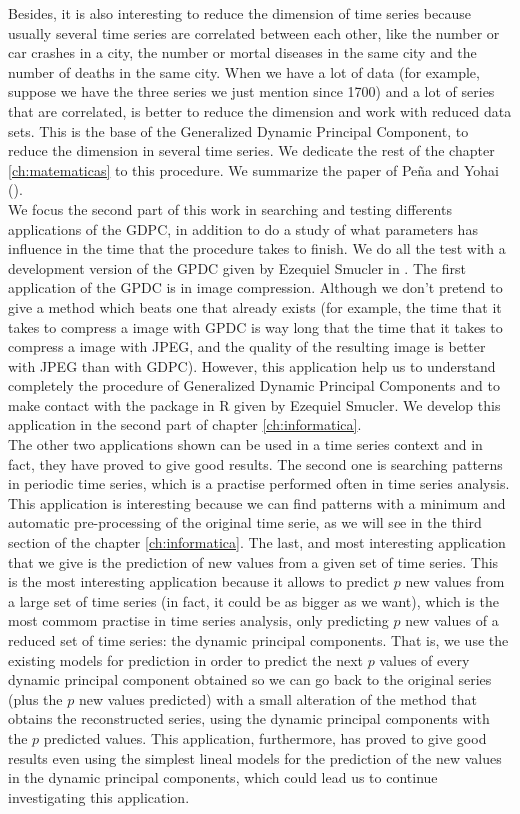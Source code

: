 Besides, it is also interesting to reduce the dimension of time series because usually several time series are correlated between each other, like the number or car crashes in a city, the number or mortal diseases in the same city and the number of deaths in the same city. When we have a lot of data (for example, suppose we have the three series we just mention since 1700) and a lot of series that are correlated, is better to reduce the dimension and work with reduced data sets. This is the base of the Generalized Dynamic Principal Component, to reduce the dimension in several time series. We dedicate the rest of the chapter \ref{ch:matematicas} to this procedure. We summarize the paper of Peña and Yohai (\cite{pena16}).\\

We focus the second part of this work in searching and testing differents applications of the GDPC, in addition to do a study of what parameters has influence in the time that the procedure takes to finish. We do all the test with a development version of the GPDC given by Ezequiel Smucler in \cite{ezeq}. The first application of the GPDC is in image compression. Although we don't pretend to give a method which beats one that already exists (for example, the time that it takes to compress a image with GPDC is way long that the time that it takes to compress a image with JPEG, and the quality of the resulting image is better with JPEG than with GDPC). However, this application help us to understand completely the procedure of Generalized Dynamic Principal Components and to make contact with the package in R given by Ezequiel Smucler. We develop this application in the second part of chapter \ref{ch:informatica}.\\

The other two applications shown can be used in a time series context and in fact, they have proved to give good results. The second one is searching patterns in periodic time series, which is a practise performed often in time series analysis. This application is interesting because we can find patterns with a minimum and automatic pre-processing of the original time serie, as we will see in the third section of the chapter \ref{ch:informatica}. The last, and most interesting application that we give is the prediction of new values from a given set of time series. This is the most interesting application because it allows to predict $p$ new values from a large set of time series (in fact, it could be as bigger as we want), which is the most commom practise in time series analysis, only predicting $p$ new values of a reduced set of time series: the dynamic principal components. That is, we use the existing models for prediction in order to predict the next $p$ values of every dynamic principal component obtained so we can go back to the original series (plus the $p$ new values predicted) with a small alteration of the method that obtains the reconstructed series, using the dynamic principal components with the $p$ predicted values. This application, furthermore, has proved to give good results even using the simplest lineal models for the prediction of the new values in the dynamic principal components, which could lead us to continue investigating this application.\\

